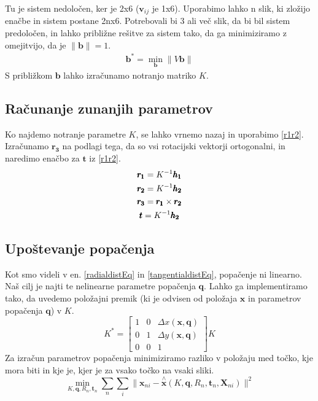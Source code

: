 Tu je sistem nedoločen, ker je 2x6 ($\pmb{v}_{ij}$ je 1x6). Uporabimo lahko n slik, ki zložijo enačbe in sistem postane 2nx6. Potrebovali bi 3 ali več slik, da bi bil sistem predoločen, in lahko približne rešitve za sistem tako, da ga minimiziramo z omejitvijo, da je $\|\pmb{b}\|=1$.
\begin{gather}
    \pmb{b}^*=\min_{\pmb{b}}\|V\pmb{b}\|
    \label{bmin}
\end{gather}
S približkom $\pmb{b}$ lahko izračunamo notranjo matriko $K$.

\subsection{Računanje zunanjih parametrov}
Ko najdemo notranje parametre $K$, se lahko vrnemo nazaj in uporabimo \ref{r1r2}. Izračunamo $\pmb{r_3}$ na podlagi tega, da so vsi rotacijski vektorji ortogonalni, in naredimo enačbo za $\pmb{t}$ iz \ref{r1r2}.
\begin{gather}
    \pmb{r_1}=K^{-1}\pmb{h_1} \notag\\
    \pmb{r_2}=K^{-1}\pmb{h_2} \notag\\
    \pmb{r_3}=\pmb{r_1} \times\pmb{r_2} \notag\\
    \pmb{t}=K^{-1}\pmb{h_2} 
    \label{extrinsicequations}
\end{gather}

\subsection{Upoštevanje popačenja}

Kot smo videli v en. \ref{radialdistEq} in \ref{tangentialdistEq}, popačenje ni linearno. Naš cilj je najti te nelinearne parametre popačenja $\pmb{q}$. Lahko ga implementiramo tako, da uvedemo položajni premik (ki je odvisen od položaja $\pmb{x}$ in parametrov popačenja $\pmb{q}$) v $K$.
\[
    K^*=\begin{bmatrix}
        1   &   0   &   \Delta x(\pmb{x, q}) \\
        0   &   1   &   \Delta y(\pmb{x, q}) \\
        0   &   0   &   1
    \end{bmatrix}
    K
\]
Za izračun parametrov popačenja minimiziramo razliko v položaju med točko, kje mora biti in kje je, kjer je za vsako točko na vsaki sliki.
\begin{equation}
    \min_{K, \pmb{q}, R_n, \pmb{t}_n}
    \sum_n  \sum_i
    \|
        \pmb{x}_{ni} - \overset{\wedge}{\pmb{x}}(K, \pmb{q}, R_n, \pmb{t}_n, \pmb{X}_{ni})
    \|^2
    \label{distMinEq}
\end{equation}

